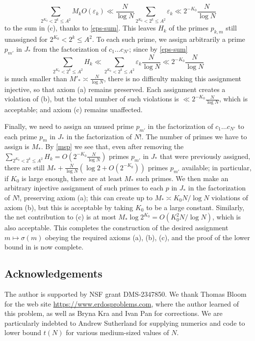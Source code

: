 \documentclass[12pt,a4paper,reqno]{amsart}
\numberwithin{equation}{section}
\theoremstyle{plain}
\theoremstyle{definition}
\newcommand\eps{\varepsilon}
\begin{document}
$$ \sum_{2^{K_0} < 2^k \leq A^2} M_k O(\eps_k) \ll \frac{N}{\log N} \sum_{2^{K_0} < 2^k \leq A^2} \eps_k \ll 2^{-K_0} \frac{N}{\log N} $$
to the sum in (c), thanks to \eqref{eps-sum}.  This leaves $H_k$ of the primes $p_{k,m}$ still unassigned for $2^{K_0} < 2^k \leq A^2$.  To each such prime, we assign arbitrarily a prime $p_{m'}$ in $J_*$ from the factorization of $c_1 \dots c_{N'}$; since by \eqref{eps-sum}
$$ \sum_{2^{K_0} < 2^k \leq A^2} H_k \ll \sum_{2^{K_0} < 2^k \leq A^2} \eps_k \frac{N}{\log N} \ll 2^{-K_0} \frac{N}{\log N}$$
is much smaller than $M'_* \asymp \frac{N}{\log N}$, there is no difficulty making this assignment injective, so that axiom (a) remains preserved.  Each assignment creates a violation of (b), but the total number of such violations is $\ll 2^{-K_0} \frac{N}{\log N}$, which is acceptable; and axiom (c) remains unaffected.

Finally, we need to assign an unused prime $p_{m'}$ in the factorization of $c_1 \dots c_{N'}$ to each prime $p_m$ in $J_*$ in the factorization of $N!$.  The number of primes we have to assign is $M_*$.  By \eqref{msp} we see that, even after removing the $\sum_{2^{K_0} < 2^k \leq A^2} H_k = O( 2^{-K_0} \frac{N}{\log N})$ primes $p_{m'}$ in $J_*$ that were previously assigned, there are still $M_* + \frac{N}{\log N} (\log 2 + O(2^{-K_0}) )$ primes $p_{m'}$ available; in particular, if $K_0$ is large enough, there are at least $M_*$ such primes.  We then make an arbitrary injective assignment of such primes to each $p$ in $J_*$ in the factorization of $N!$, preserving axiom (a); this can create up to $M_* \asymp K_0 N / \log N$ violations of axiom (b), but this is acceptable by taking $K_0$ to be a large constant.  Similarly, the net contribution to (c) is at most $M_* \log 2^{K_0} = O(K_0^2 N / \log N)$, which is also acceptable.  This completes the construction of the desired assignment $m \mapsto \sigma(m)$ obeying the required axioms (a), (b), (c), and the proof of the lower bound in  is now complete.

 \subsection{Acknowledgements}

The author is supported by NSF grant DMS-2347850.  We thank Thomas Bloom for the web site \url{https://www.erdosproblems.com}, where the author learned of this problem, as well as Bryna Kra and Ivan Pan for  corrections. We are particularly indebted to Andrew Sutherland for supplying numerics and code to lower bound $t(N)$ for various medium-sized values of $N$.
\end{document}
